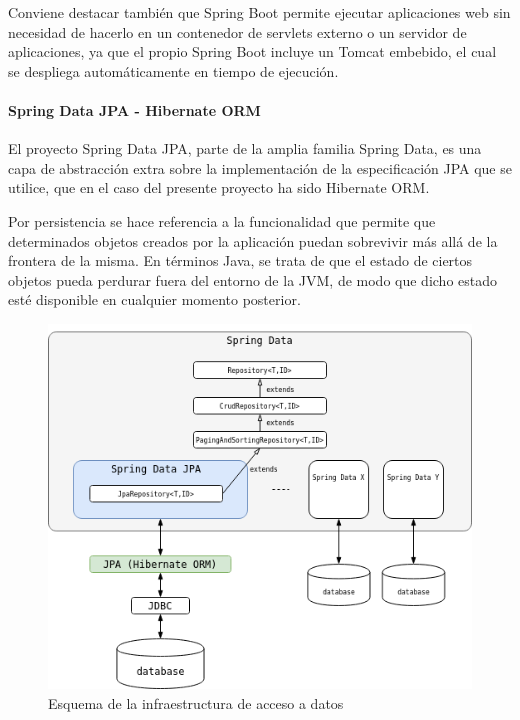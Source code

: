 \documentclass[a4paper]{article}
\begin{document}
    Conviene destacar también que Spring Boot permite ejecutar aplicaciones web sin necesidad de hacerlo en un contenedor de servlets externo o un servidor de aplicaciones, ya que el propio Spring Boot incluye un Tomcat embebido, el cual se despliega automáticamente en tiempo de ejecución.
    
    \paragraph{Spring Data JPA - Hibernate ORM} \label{sec:springdata}
    El proyecto Spring Data JPA, parte de la amplia familia Spring Data, es una capa de abstracción extra sobre la implementación de la especificación JPA que se utilice, que en el caso del presente proyecto ha sido Hibernate ORM.
    
    Por persistencia se hace referencia a la funcionalidad que permite que determinados objetos creados por la aplicación puedan sobrevivir más allá de la frontera de la misma. En términos Java, se trata de que el estado de ciertos objetos pueda perdurar fuera del entorno de la JVM, de modo que dicho estado esté disponible en cualquier momento posterior.
    
    \begin{figure}[hbt!]
    	\centering
    	\includegraphics[width=\textwidth,keepaspectratio]{data_access}
    	\caption{Esquema de la infraestructura de acceso a datos}
    	\label{fig:data_access}
    \end{figure}
    
\end{document}
